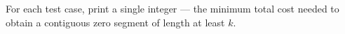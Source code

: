 For each test case, print a single integer --- the minimum total cost needed to obtain a contiguous zero segment of length at least $k$.
